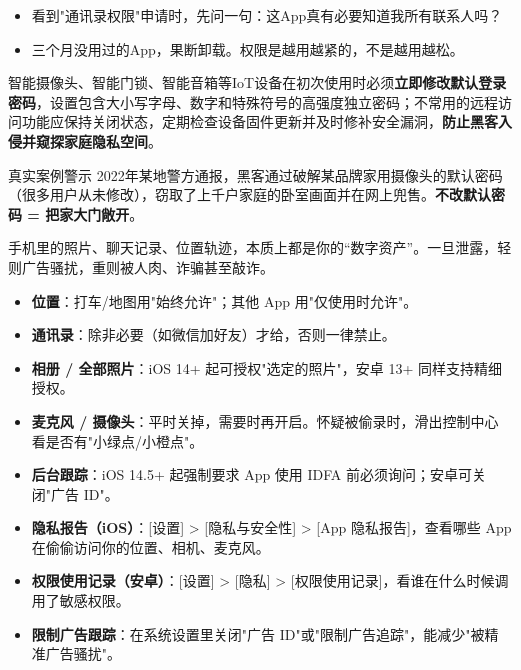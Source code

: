 \begin{itemize}
  \item 看到"通讯录权限"申请时，先问一句：这App真有必要知道我所有联系人吗？
  \item 三个月没用过的App，果断卸载。权限是越用越紧的，不是越用越松。
\end{itemize}


智能摄像头、智能门锁、智能音箱等IoT设备在初次使用时必须\textbf{立即修改默认登录密码}，设置包含大小写字母、数字和特殊符号的高强度独立密码；不常用的远程访问功能应保持关闭状态，定期检查设备固件更新并及时修补安全漏洞，\textbf{防止黑客入侵并窥探家庭隐私空间}。

\begin{tcbwarn}{真实案例警示}
2022年某地警方通报，黑客通过破解某品牌家用摄像头的默认密码（很多用户从未修改），窃取了上千户家庭的卧室画面并在网上兜售。\textbf{不改默认密码 = 把家大门敞开}。

\end{tcbwarn}


手机里的照片、聊天记录、位置轨迹，本质上都是你的“数字资产”。一旦泄露，轻则广告骚扰，重则被人肉、诈骗甚至敲诈。


\begin{itemize}
  \item \textbf{位置}：打车/地图用"始终允许"；其他 App 用"仅使用时允许"。
  \item \textbf{通讯录}：除非必要（如微信加好友）才给，否则一律禁止。
  \item \textbf{相册 / 全部照片}：iOS 14+ 起可授权"选定的照片"，安卓 13+ 同样支持精细授权。
  \item \textbf{麦克风 / 摄像头}：平时关掉，需要时再开启。怀疑被偷录时，滑出控制中心看是否有"小绿点/小橙点"。
  \item \textbf{后台跟踪}：iOS 14.5+ 起强制要求 App 使用 IDFA 前必须询问；安卓可关闭"广告 ID"。
\end{itemize}


\begin{itemize}
  \item \textbf{隐私报告（iOS）}：[设置] > [隐私与安全性] > [App 隐私报告]，查看哪些 App 在偷偷访问你的位置、相机、麦克风。
  \item \textbf{权限使用记录（安卓）}：[设置] > [隐私] > [权限使用记录]，看谁在什么时候调用了敏感权限。
  \item \textbf{限制广告跟踪}：在系统设置里关闭"广告 ID"或"限制广告追踪"，能减少"被精准广告骚扰"。
\end{itemize}

